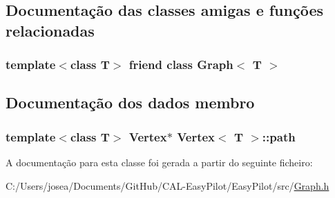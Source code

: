 \subsection{Documentação das classes amigas e funções relacionadas}
\hypertarget{class_vertex_aefa9b76cd57411c5354e5620dc2d84dd}{}
\subsubsection[{Graph$<$ T $>$}]{\setlength{\rightskip}{0pt plus 5cm}template$<$class T$>$ friend class {\bf Graph}$<$ T $>$\hspace{0.3cm}{\ttfamily [friend]}}\label{class_vertex_aefa9b76cd57411c5354e5620dc2d84dd}


\subsection{Documentação dos dados membro}
\hypertarget{class_vertex_abd40febd917aa25add6bd42237c8463a}{}
\subsubsection[{path}]{\setlength{\rightskip}{0pt plus 5cm}template$<$class T$>$ {\bf Vertex}$\ast$ {\bf Vertex}$<$ T $>$\+::path}\label{class_vertex_abd40febd917aa25add6bd42237c8463a}


A documentação para esta classe foi gerada a partir do seguinte ficheiro\+:\begin{DoxyCompactItemize}
\item 
C\+:/\+Users/josea/\+Documents/\+Git\+Hub/\+C\+A\+L-\/\+Easy\+Pilot/\+Easy\+Pilot/src/\hyperlink{_graph_8h}{Graph.\+h}\end{DoxyCompactItemize}
